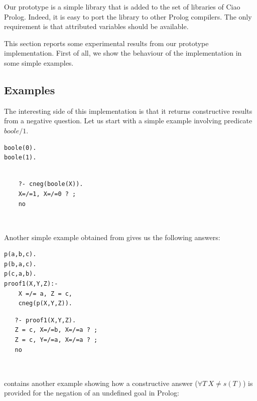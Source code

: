 \documentclass{tlp}
\begin{document}
Our prototype is a simple library that is added to the set of
libraries of Ciao Prolog. Indeed, it is easy to port the library to
other Prolog compilers. The only requirement is that attributed
variables should be available.

This section reports some experimental results from our prototype
implementation.  First of all, we show the behaviour of the
implementation in some simple examples.


\subsection{Examples}
\label{examples}

The interesting side of this implementation is that it returns
constructive results from a negative question. Let us start with a
simple example involving predicate $boole/1$.

{
\begin{minipage}{2in}
\begin{verbatim}
boole(0).
boole(1).
\end{verbatim}
\end{minipage}
\begin{minipage}{2in}
\begin{verbatim} 

    ?- cneg(boole(X)).
    X=/=1, X=/=0 ? ;
    no

\end{verbatim} 
\end{minipage}\\
}
Another simple example obtained from \cite{Stuckey95} gives us the
following answers:

{
\begin{minipage}{2in}
\begin{verbatim}
p(a,b,c).
p(b,a,c).
p(c,a,b).
proof1(X,Y,Z):-
    X =/= a, Z = c,
    cneg(p(X,Y,Z)).

\end{verbatim}
\end{minipage}
\begin{minipage}{2in}
\begin{verbatim} 
   ?- proof1(X,Y,Z).
   Z = c, X=/=b, X=/=a ? ;
   Z = c, Y=/=a, X=/=a ? ;
   no
\end{verbatim} 
\end{minipage}\\
}
\cite{Stuckey95} contains another example showing how a constructive
answer ($\forall T ~ X \neq s(T)$) is provided for the negation of an
undefined goal in Prolog:
\end{document}

